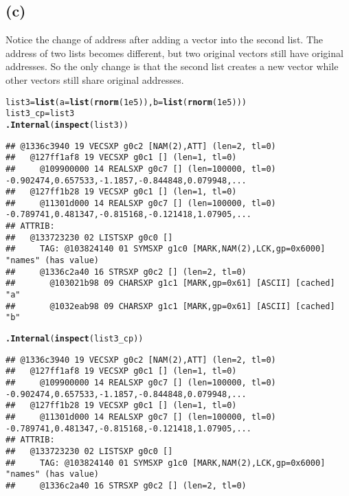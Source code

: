 \documentclass{article}\usepackage[]{graphicx}\usepackage[]{color}
\makeatletter
\newcommand{\hlnum}[1]{\textcolor[rgb]{0.686,0.059,0.569}{#1}}%
\newcommand{\hlstd}[1]{\textcolor[rgb]{0.345,0.345,0.345}{#1}}%
\newcommand{\hlkwb}[1]{\textcolor[rgb]{0.69,0.353,0.396}{#1}}%
\newcommand{\hlkwc}[1]{\textcolor[rgb]{0.333,0.667,0.333}{#1}}%
\newcommand{\hlkwd}[1]{\textcolor[rgb]{0.737,0.353,0.396}{\textbf{#1}}}%
\newenvironment{kframe}{%
 \def\at@end@of@kframe{}%
 \ifinner\ifhmode%
  \def\at@end@of@kframe{\end{minipage}}%
  \begin{minipage}{\columnwidth}%
 \fi\fi%
 \def\FrameCommand##1{\hskip\@totalleftmargin \hskip-\fboxsep
 \colorbox{shadecolor}{##1}\hskip-\fboxsep
     \hskip-\linewidth \hskip-\@totalleftmargin \hskip\columnwidth}%
 \MakeFramed {\advance\hsize-\width
   \@totalleftmargin\z@ \linewidth\hsize
   \@setminipage}}%
 {\par\unskip\endMakeFramed%
 \at@end@of@kframe}
\newenvironment{knitrout}{}{} %
\makeatother
\begin{document}
\subsection{(c)}
Notice the change of address after adding a vector into the second list. The address of two lists becomes different, but two original vectors still have original addresses. So the only change is that the second list creates a new vector while other vectors still share original addresses.
\begin{knitrout}
\color{fgcolor}\begin{kframe}
\begin{alltt}
\hlstd{list3}\hlkwb{=}\hlkwd{list}\hlstd{(}\hlkwc{a}\hlstd{=}\hlkwd{list}\hlstd{(}\hlkwd{rnorm}\hlstd{(}\hlnum{1e5}\hlstd{)),}\hlkwc{b}\hlstd{=}\hlkwd{list}\hlstd{(}\hlkwd{rnorm}\hlstd{(}\hlnum{1e5}\hlstd{)))}
\hlstd{list3_cp}\hlkwb{=}\hlstd{list3}
\hlkwd{.Internal}\hlstd{(}\hlkwd{inspect}\hlstd{(list3))}
\end{alltt}
\begin{verbatim}
## @1336c3940 19 VECSXP g0c2 [NAM(2),ATT] (len=2, tl=0)
##   @127ff1af8 19 VECSXP g0c1 [] (len=1, tl=0)
##     @109900000 14 REALSXP g0c7 [] (len=100000, tl=0) -0.902474,0.657533,-1.1857,-0.844848,0.079948,...
##   @127ff1b28 19 VECSXP g0c1 [] (len=1, tl=0)
##     @11301d000 14 REALSXP g0c7 [] (len=100000, tl=0) -0.789741,0.481347,-0.815168,-0.121418,1.07905,...
## ATTRIB:
##   @133723230 02 LISTSXP g0c0 [] 
##     TAG: @103824140 01 SYMSXP g1c0 [MARK,NAM(2),LCK,gp=0x6000] "names" (has value)
##     @1336c2a40 16 STRSXP g0c2 [] (len=2, tl=0)
##       @103021b98 09 CHARSXP g1c1 [MARK,gp=0x61] [ASCII] [cached] "a"
##       @1032eab98 09 CHARSXP g1c1 [MARK,gp=0x61] [ASCII] [cached] "b"
\end{verbatim}
\begin{alltt}
\hlkwd{.Internal}\hlstd{(}\hlkwd{inspect}\hlstd{(list3_cp))}
\end{alltt}
\begin{verbatim}
## @1336c3940 19 VECSXP g0c2 [NAM(2),ATT] (len=2, tl=0)
##   @127ff1af8 19 VECSXP g0c1 [] (len=1, tl=0)
##     @109900000 14 REALSXP g0c7 [] (len=100000, tl=0) -0.902474,0.657533,-1.1857,-0.844848,0.079948,...
##   @127ff1b28 19 VECSXP g0c1 [] (len=1, tl=0)
##     @11301d000 14 REALSXP g0c7 [] (len=100000, tl=0) -0.789741,0.481347,-0.815168,-0.121418,1.07905,...
## ATTRIB:
##   @133723230 02 LISTSXP g0c0 [] 
##     TAG: @103824140 01 SYMSXP g1c0 [MARK,NAM(2),LCK,gp=0x6000] "names" (has value)
##     @1336c2a40 16 STRSXP g0c2 [] (len=2, tl=0)

\end{verbatim}
\end{kframe}
\end{knitrout}
\end{document}
